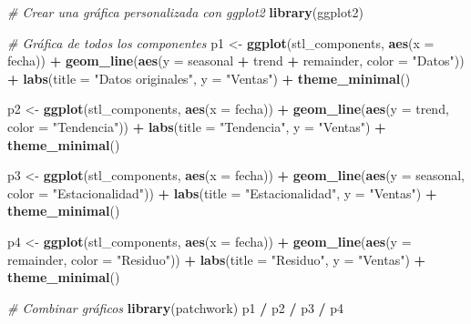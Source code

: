 \documentclass[
]{book}
\newenvironment{Shaded}{\begin{snugshade}}{\end{snugshade}}
\newcommand{\AttributeTok}[1]{\textcolor[rgb]{0.13,0.29,0.53}{#1}}
\newcommand{\CommentTok}[1]{\textcolor[rgb]{0.56,0.35,0.01}{\textit{#1}}}
\newcommand{\FunctionTok}[1]{\textcolor[rgb]{0.13,0.29,0.53}{\textbf{#1}}}
\newcommand{\NormalTok}[1]{#1}
\newcommand{\OtherTok}[1]{\textcolor[rgb]{0.56,0.35,0.01}{#1}}
\newcommand{\SpecialCharTok}[1]{\textcolor[rgb]{0.81,0.36,0.00}{\textbf{#1}}}
\newcommand{\StringTok}[1]{\textcolor[rgb]{0.31,0.60,0.02}{#1}}
\begin{document}
\begin{Shaded}
\begin{Highlighting}[]
\CommentTok{\# Crear una gráfica personalizada con ggplot2}
\FunctionTok{library}\NormalTok{(ggplot2)}

\CommentTok{\# Gráfica de todos los componentes}
\NormalTok{p1 }\OtherTok{\textless{}{-}} \FunctionTok{ggplot}\NormalTok{(stl\_components, }\FunctionTok{aes}\NormalTok{(}\AttributeTok{x =}\NormalTok{ fecha)) }\SpecialCharTok{+}
  \FunctionTok{geom\_line}\NormalTok{(}\FunctionTok{aes}\NormalTok{(}\AttributeTok{y =}\NormalTok{ seasonal }\SpecialCharTok{+}\NormalTok{ trend }\SpecialCharTok{+}\NormalTok{ remainder, }\AttributeTok{color =} \StringTok{"Datos"}\NormalTok{)) }\SpecialCharTok{+}
  \FunctionTok{labs}\NormalTok{(}\AttributeTok{title =} \StringTok{"Datos originales"}\NormalTok{, }\AttributeTok{y =} \StringTok{"Ventas"}\NormalTok{) }\SpecialCharTok{+}
  \FunctionTok{theme\_minimal}\NormalTok{()}

\NormalTok{p2 }\OtherTok{\textless{}{-}} \FunctionTok{ggplot}\NormalTok{(stl\_components, }\FunctionTok{aes}\NormalTok{(}\AttributeTok{x =}\NormalTok{ fecha)) }\SpecialCharTok{+}
  \FunctionTok{geom\_line}\NormalTok{(}\FunctionTok{aes}\NormalTok{(}\AttributeTok{y =}\NormalTok{ trend, }\AttributeTok{color =} \StringTok{"Tendencia"}\NormalTok{)) }\SpecialCharTok{+}
  \FunctionTok{labs}\NormalTok{(}\AttributeTok{title =} \StringTok{"Tendencia"}\NormalTok{, }\AttributeTok{y =} \StringTok{"Ventas"}\NormalTok{) }\SpecialCharTok{+}
  \FunctionTok{theme\_minimal}\NormalTok{()}

\NormalTok{p3 }\OtherTok{\textless{}{-}} \FunctionTok{ggplot}\NormalTok{(stl\_components, }\FunctionTok{aes}\NormalTok{(}\AttributeTok{x =}\NormalTok{ fecha)) }\SpecialCharTok{+}
  \FunctionTok{geom\_line}\NormalTok{(}\FunctionTok{aes}\NormalTok{(}\AttributeTok{y =}\NormalTok{ seasonal, }\AttributeTok{color =} \StringTok{"Estacionalidad"}\NormalTok{)) }\SpecialCharTok{+}
  \FunctionTok{labs}\NormalTok{(}\AttributeTok{title =} \StringTok{"Estacionalidad"}\NormalTok{, }\AttributeTok{y =} \StringTok{"Ventas"}\NormalTok{) }\SpecialCharTok{+}
  \FunctionTok{theme\_minimal}\NormalTok{()}

\NormalTok{p4 }\OtherTok{\textless{}{-}} \FunctionTok{ggplot}\NormalTok{(stl\_components, }\FunctionTok{aes}\NormalTok{(}\AttributeTok{x =}\NormalTok{ fecha)) }\SpecialCharTok{+}
  \FunctionTok{geom\_line}\NormalTok{(}\FunctionTok{aes}\NormalTok{(}\AttributeTok{y =}\NormalTok{ remainder, }\AttributeTok{color =} \StringTok{"Residuo"}\NormalTok{)) }\SpecialCharTok{+}
  \FunctionTok{labs}\NormalTok{(}\AttributeTok{title =} \StringTok{"Residuo"}\NormalTok{, }\AttributeTok{y =} \StringTok{"Ventas"}\NormalTok{) }\SpecialCharTok{+}
  \FunctionTok{theme\_minimal}\NormalTok{()}

\CommentTok{\# Combinar gráficos}
\FunctionTok{library}\NormalTok{(patchwork)}
\NormalTok{p1 }\SpecialCharTok{/}\NormalTok{ p2 }\SpecialCharTok{/}\NormalTok{ p3 }\SpecialCharTok{/}\NormalTok{ p4}
\end{Highlighting}
\end{Shaded}
\end{document}
